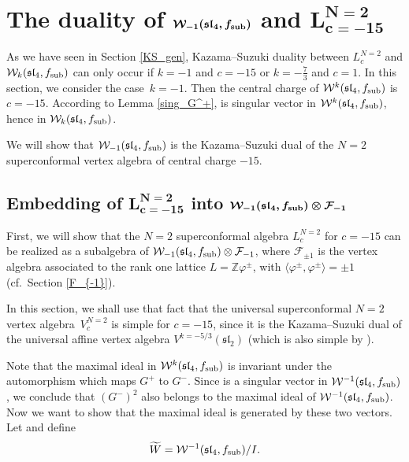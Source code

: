 \documentclass[pdftex]{sigma}
\numberwithin{equation}{section}
\newcommand{\F}{\mathcal F}
\begin{document}
\section[The duality of W\_-1(sl\_4, f\_sub) and L\^{}N=2\_c=-15]{The duality of $\boldsymbol{\mathcal{W}_{-1}(\mathfrak{sl}_4, f_{\rm sub})}$ and $\boldsymbol{L^{N=2}_{c=-15}}$} \label{duality}


As we have seen in Section \ref{KS_gen}, Kazama--Suzuki duality between $L^{N=2}_c$ and $\mathcal W_k(\mathfrak{sl}_4, f_{\rm sub})$ can only occur if $k=-1$ and $c=-15$ or $k=-\frac{7}{3}$ and $c=1$.
In this section, we consider the case~${k=-1}$. Then the central charge of $\mathcal{W}^{k}(\mathfrak{sl}_4, f_{\rm sub})$ is $c = -15$. According to Lemma \ref{sing_G^+},  is singular vector in $\mathcal{W}^{k}(\mathfrak{sl}_4, f_{\rm sub})$, hence  in $\mathcal{W}_{k}(\mathfrak{sl}_4, f_{\rm sub})$.

 We will show that $\mathcal{W}_{-1}(\mathfrak{sl}_4, f_{\rm sub})$ is the Kazama--Suzuki dual of the $N=2$ superconformal vertex algebra of central charge $-15$.



\subsection[Embedding of L\^{}N=2\_c=-15 into W\_-1(sl\_4, f\_ ub)]{Embedding of $\boldsymbol{ L^{N=2}_{c=-15}}$ into $\boldsymbol{\mathcal{W}_{-1}(\mathfrak{sl}_4, f_{\rm sub}) \otimes \F_{-1}}$}

First, we will show that the $N=2$ superconformal algebra $L^{N=2}_{c}$ for $c=-15$ can be realized as a subalgebra of $\mathcal{W}_{-1}(\mathfrak{sl}_4, f_{\rm sub}) \otimes \F_{-1}$, where $\F_{\pm 1}$ is the vertex algebra associated to the rank one lattice $L= {\mathbb{Z}}\varphi^{\pm}$, with $\big\langle \varphi^{\pm}, \varphi^{\pm} \big\rangle = \pm 1$ (cf.\ Section \ref{F_{-1}}).

 In this section, we shall use that fact that the universal superconformal $N=2$ vertex algebra~$V^{N=2}_{c}$ is simple for $c=-15$, since it is the Kazama--Suzuki dual of the universal affine vertex algebra $V^{k=-5/3}(\mathfrak{sl}_2)$ (which is also simple by \cite{GK}).

 Note that the maximal ideal in $\mathcal W^k(\mathfrak{sl}_4, f_{\rm sub})$ is invariant under the automorphism which maps $G^+$ to $G^-$. Since  is a singular vector in $\mathcal{W}^{-1}(\mathfrak{sl}_4, f_{\rm sub}) $, we conclude that $(G^-)^2$ also belongs to the maximal ideal of $\mathcal{W}^{-1}(\mathfrak{sl}_4, f_{\rm sub}) $. Now we want to show that the maximal ideal is generated by these two vectors.
Let  and define
\[
 \widetilde W = \mathcal{W}^{-1}(\mathfrak{sl}_4, f_{\rm sub})/I.
 \]
\end{document}
